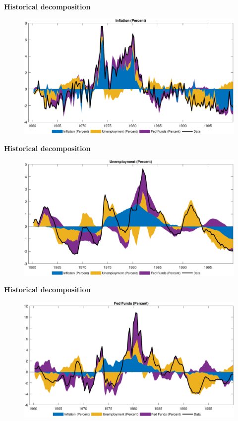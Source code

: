 
\begin{frame}
{\textbf{Historical decomposition}}\medskip

\begin{figure}[h]
\includegraphics[width=.75\textwidth]{SW_HD_1.pdf}
\end{figure}
\end{frame}


\begin{frame}
{\textbf{Historical decomposition}}\medskip

\begin{figure}[h]
\includegraphics[width=.75\textwidth]{SW_HD_2.pdf}
\end{figure}
\end{frame}


\begin{frame}
{\textbf{Historical decomposition}}\medskip

\begin{figure}[h]
\includegraphics[width=.75\textwidth]{SW_HD_3.pdf}
\end{figure}
\end{frame}

